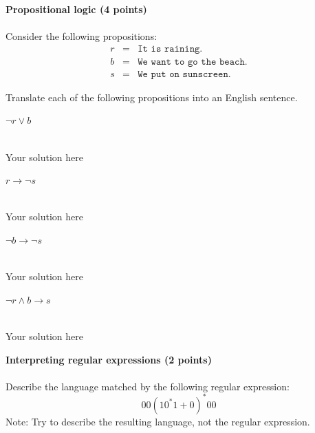 \documentclass[12pt]{article}
\newenvironment{question}[2][Question]{\begin{trivlist}
\item[\hskip \labelsep {\bfseries #1}\hskip \labelsep {\bfseries #2.}]}{\end{trivlist}}
\newenvironment{solution}[1][Solution:]{\begin{trivlist}
\item[\hskip \labelsep {\bfseries #1}\hskip \labelsep {\bfseries}]\color{blue}}{\end{trivlist}}
\begin{document}
\clearpage
\begin{question}{2}\textbf{Propositional logic (4 points)}\\\\

Consider the following propositions:
\begin{eqnarray*}
	r & = & \texttt{It is raining.}\\
	b & = & \texttt{We want to go the beach.}\\
	s & = & \texttt{We put on sunscreen.}
\end{eqnarray*}


Translate each of the following propositions into an English sentence.
\begin{enumerate}[(a)]
	\item $\neg r \lor b$
    \begin{solution}
    \;\\
    Your solution here
    \end{solution}\vspace{1em}

	\item $r \rightarrow \neg s$
    \begin{solution}
    \;\\
    Your solution here
    \end{solution}

	\item $\neg b \rightarrow \neg s$
    \begin{solution}
    \;\\
    Your solution here
    \end{solution}\vspace{1em}

	\item $\neg r \land b \rightarrow s$
    \begin{solution}
    \;\\
    Your solution here
    \end{solution}\vspace{1em}
\end{enumerate}
\end{question}


\clearpage
\begin{question}{3}\textbf{Interpreting regular expressions (2 points)} \\\\

Describe the language matched by the following regular expression:
\[ 00(10^*1 + 0)^*00\]
Note: Try to describe the resulting language, not the regular expression.
\end{question}
\end{document}
